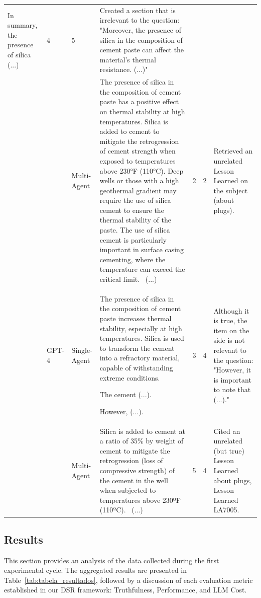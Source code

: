\begin{landscape}
\begin{table}[h]
\begin{tabular}{| m{3cm} | m{1.5cm} | m{1.5cm} |>{\scriptsize}m{9cm} | m{1.3cm} | m{1.2cm} |>{\scriptsize}m{4cm} |}
            In summary, the presence of silica (...) & 4 & 5 & Created a section that is irrelevant to the question: "Moreover, the presence of silica in the composition of cement paste can affect the material's thermal resistance. (...)" \\
            \cline{3-7}
            &  & Multi-Agent & The presence of silica in the composition of cement paste has a positive effect on thermal stability at high temperatures. Silica is added to cement to mitigate the retrogression of cement strength when exposed to temperatures above 230°F (110°C). Deep wells or those with a high geothermal gradient may require the use of silica cement to ensure the thermal stability of the paste. The use of silica cement is particularly important in surface casing cementing, where the temperature can exceed the critical limit. \ (...) & 2 & 2 & Retrieved an unrelated Lesson Learned on the subject (about plugs). \\ 
            \cline{2-7}
            & GPT-4 & Single-Agent & The presence of silica in the composition of cement paste increases thermal stability, especially at high temperatures. Silica is used to transform the cement into a refractory material, capable of withstanding extreme conditions. 
            
            The cement (...).

            However, (...). & 3 & 4 & Although it is true, the item on the side is not relevant to the question: "However, it is important to note that (...)." \\
            \cline{3-7}
            &  & Multi-Agent & Silica is added to cement at a ratio of 35\% by weight of cement to mitigate the retrogression (loss of compressive strength) of the cement in the well when subjected to temperatures above 230ºF (110ºC). \ (...) & 5 & 4 & Cited an unrelated (but true) Lesson Learned about plugs, Lesson Learned LA7005. \\
            \hline
            \end{tabular}
            \end{table}
        \end{landscape}
            
        \subsection{Results}
        
            This section provides an analysis of the data collected during the first experimental cycle. The aggregated results are presented in Table~\ref{tab:tabela_resultados}, followed by a discussion of each evaluation metric established in our DSR framework: Truthfulness, Performance, and LLM Cost.

